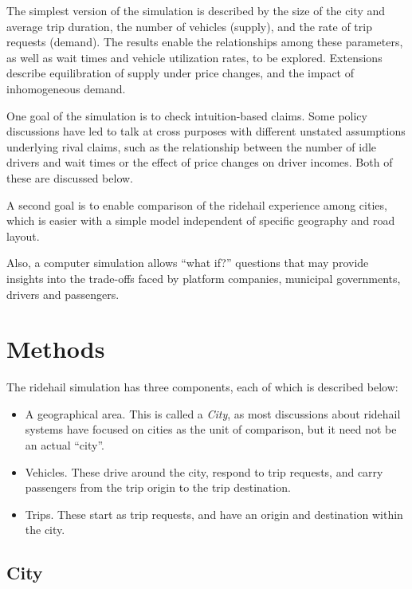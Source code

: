 \documentclass[
  letterpaper,
]{article}
\begin{document}
The simplest version of the simulation is described by the size of the
city and average trip duration, the number of vehicles (supply), and the
rate of trip requests (demand). The results enable the relationships
among these parameters, as well as wait times and vehicle utilization
rates, to be explored. Extensions describe equilibration of supply under
price changes, and the impact of inhomogeneous demand.

One goal of the simulation is to check intuition-based claims. Some
policy discussions have led to talk at cross purposes with different
unstated assumptions underlying rival claims, such as the relationship
between the number of idle drivers and wait times or the effect of price
changes on driver incomes. Both of these are discussed below.

A second goal is to enable comparison of the ridehail experience among
cities, which is easier with a simple model independent of specific
geography and road layout.

Also, a computer simulation allows ``what if?'' questions that may
provide insights into the trade-offs faced by platform companies,
municipal governments, drivers and passengers.

\hypertarget{methods}{%
\section{Methods}\label{methods}}

The ridehail simulation has three components, each of which is described
below:

\begin{itemize}
\item
  A geographical area. This is called a \emph{City}, as most discussions
  about ridehail systems have focused on cities as the unit of
  comparison, but it need not be an actual ``city''.
\item
  Vehicles. These drive around the city, respond to trip requests, and
  carry passengers from the trip origin to the trip destination.
\item
  Trips. These start as trip requests, and have an origin and
  destination within the city.
\end{itemize}

\hypertarget{city}{%
\subsection{City}\label{city}}
\end{document}
